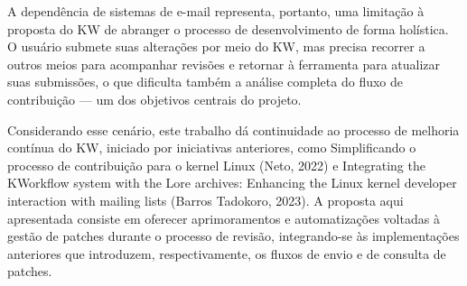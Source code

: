 A dependência de sistemas de e-mail representa, portanto, uma limitação à proposta do KW de abranger o processo de desenvolvimento de forma holística. O usuário submete suas alterações por meio do KW, mas precisa recorrer a outros meios para acompanhar revisões e retornar à ferramenta para atualizar suas submissões, o que dificulta também a análise completa do fluxo de contribuição — um dos objetivos centrais do projeto.

Considerando esse cenário, este trabalho dá continuidade ao processo de melhoria contínua do KW, iniciado por iniciativas anteriores, como Simplificando o processo de contribuição para o kernel Linux (Neto, 2022) e Integrating the KWorkflow system with the Lore archives: Enhancing the Linux kernel developer interaction with mailing lists (Barros Tadokoro, 2023). A proposta aqui apresentada consiste em oferecer aprimoramentos e automatizações voltadas à gestão de patches durante o processo de revisão, integrando-se às implementações anteriores que introduzem, respectivamente, os fluxos de envio e de consulta de patches.

\label{cap:introducao}
